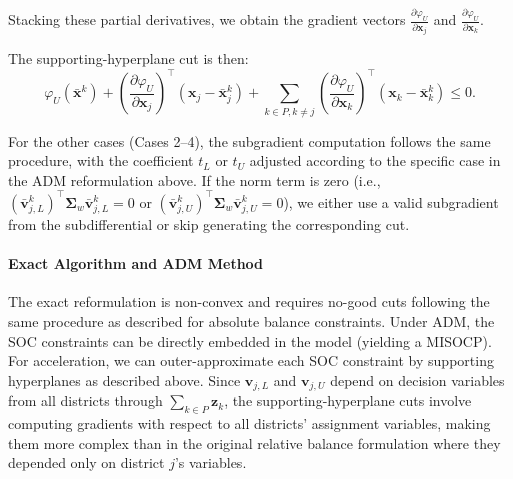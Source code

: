 \documentclass[preprint,12pt,authoryear]{elsarticle}
\begin{document}
Stacking these partial derivatives, we obtain the gradient vectors $\frac{\partial \varphi_U}{\partial \mathbf{x}_j}$ and $\frac{\partial \varphi_U}{\partial \mathbf{x}_k}$.

The supporting-hyperplane cut is then:
\begin{equation}
\varphi_U(\bar{\mathbf{x}}^k) + \left(\frac{\partial \varphi_U}{\partial \mathbf{x}_j}\right)^\top (\mathbf{x}_j - \bar{\mathbf{x}}_j^k) + \sum_{k \in P, k \neq j} \left(\frac{\partial \varphi_U}{\partial \mathbf{x}_k}\right)^\top (\mathbf{x}_k - \bar{\mathbf{x}}_k^k) \leqslant 0.
\label{eq:assign_dep_rel_balance_d2_supporting_cut_upper}
\end{equation}

For the other cases (Cases 2--4), the subgradient computation follows the same procedure, with the coefficient $t_L$ or $t_U$ adjusted according to the specific case in the ADM reformulation above. If the norm term is zero (i.e., $(\bar{\mathbf{v}}_{j,L}^k)^\top \boldsymbol{\Sigma}_w \bar{\mathbf{v}}_{j,L}^k = 0$ or $(\bar{\mathbf{v}}_{j,U}^k)^\top \boldsymbol{\Sigma}_w \bar{\mathbf{v}}_{j,U}^k = 0$), we either use a valid subgradient from the subdifferential or skip generating the corresponding cut.

\paragraph{Exact Algorithm and ADM Method}
The exact reformulation is non-convex and requires no-good cuts following the same procedure as described for absolute balance constraints. Under ADM, the SOC constraints can be directly embedded in the model (yielding a MISOCP). For acceleration, we can outer-approximate each SOC constraint by supporting hyperplanes as described above. Since $\mathbf{v}_{j,L}$ and $\mathbf{v}_{j,U}$ depend on decision variables from all districts through $\sum_{k \in P} \mathbf{z}_k$, the supporting-hyperplane cuts involve computing gradients with respect to all districts' assignment variables, making them more complex than in the original relative balance formulation where they depended only on district $j$'s variables.
\end{document}
